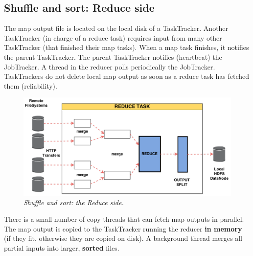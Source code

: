 		\subsection{Shuffle and sort: Reduce side}
			\par
			The map output file is located on the local disk of a TaskTracker. Another TaskTracker (in charge of a reduce task) requires input from many other TaskTracker (that finished their map tasks).
			\newline
			When a map task finishes, it notifies the parent TaskTracker. The parent TaskTracker notifies (heartbeat) the JobTracker. A thread in the reducer polls periodically the JobTracker. TaskTrackers do not delete local map output as soon as a reduce task has fetched them (reliability).
			\begin{figure}[h!]
				\centering
				\includegraphics[width=\linewidth]{images/sasreduceside.png}
				\caption{\textit{Shuffle and sort: the Reduce side.}}
			\end{figure}
			\par
			There is a small number of copy threads that can fetch map outputs in parallel. The map output is copied to the TaskTracker running the reducer \textbf{in memory} (if they fit, otherwise they are copied on disk).
			\newline
			A background thread merges all partial inputs into larger, \textbf{sorted} files.